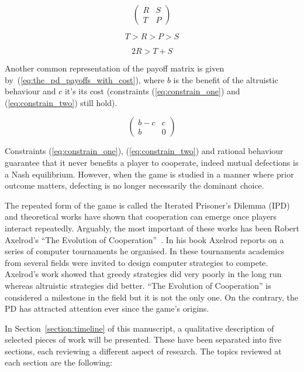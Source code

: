 \documentclass{article}
\theoremstyle{definition}
\begin{document}
\begin{equation} \label{eq:the_pd_payoffs}
    \begin{pmatrix}
    R & S \\ T & P
    \end{pmatrix}
\end{equation}

\begin{equation}\label{eq:constrain_one}
    T > R > P > S
\end{equation}

\begin{equation}\label{eq:constrain_two}
    2R > T + S
\end{equation}

Another common representation of the payoff matrix is given by~(\ref{eq:the_pd_payoffs_with_cost}),
where \(b\) is the benefit of the altruistic behaviour and \(c\) it's its cost
(constraints (\ref{eq:constrain_one}) and (\ref{eq:constrain_two}) still hold).

\begin{equation}\label{eq:the_pd_payoffs_with_cost}
    \begin{pmatrix}
        b - c & c \\ b & 0
    \end{pmatrix}
\end{equation}

Constraints (\ref{eq:constrain_one}), (\ref{eq:constrain_two}) and rational
behaviour guarantee that it never benefits a player to cooperate, indeed mutual
defections is a Nash equilibrium. However, when the game is studied in a manner
where prior outcome matters, defecting is no longer necessarily the dominant
choice.

The repeated form of the game is called the Iterated Prisoner's Dilemma (IPD)
and theoretical works have shown that cooperation can emerge once players
interact repeatedly. Arguably, the most important of these works has been Robert
Axelrod's ``The Evolution of Cooperation''~\cite{Axelrod1984}. In his book
Axelrod reports on a series of computer tournaments he organised. In these
tournaments academics from several fields were invited to design computer
strategies to compete. Axelrod's work showed that greedy
strategies did very poorly in the long run whereas altruistic strategies did
better. ``The Evolution of Cooperation'' is considered a milestone in the field
but it is not the only one. On the contrary, the PD has attracted attention ever
since the game's origins.

In Section~\ref{section:timeline} of this manuscript, a qualitative description of selected pieces
of work will be presented. These have been separated into five sections, each
reviewing a different aspect of research. The topics reviewed at each section
are the following:
\end{document}
